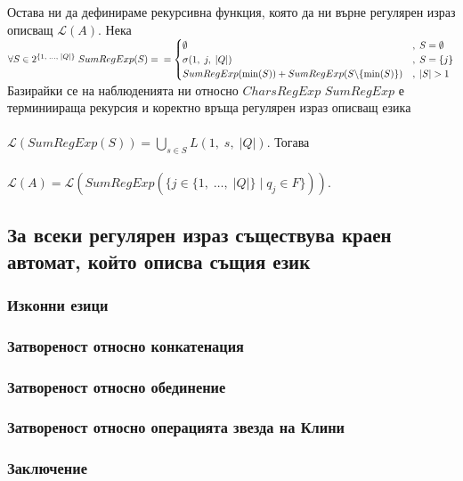 \documentclass[a4paper, 12pt, oneside]{article}
\newcommand{\Lang}{\mathcal{L}}
\begin{document}
Остава ни да дефинираме рекурсивна функция, която да ни върне регулярен израз описващ $\Lang(A)$. Нека \\

$\forall S \in 2^{\{1, \; \dots, \; |Q|\}} \; SumRegExp(S) = \\
= \begin{cases}
    \emptyset & , \; S = \emptyset \\
    \sigma(1, \; j, \; |Q|) & , \; S = \{j\} \\
    SumRegExp(\min(S)) + SumRegExp(S \backslash \{\min(S)\}) & , \; |S| > 1 
\end{cases}$ \\

Базирайки се на наблюденията ни относно $CharsRegExp$ $SumRegExp$
е терминиираща рекурсия и коректно връща регулярен израз описващ езика \\\\
$\Lang(SumRegExp(S)) = \displaystyle\bigcup_{s \in S} L(1, \; s, \; |Q|)$. Тогава \\\\

$\Lang(A) = \Lang(SumRegExp(\{j \in \{1, \; \dots, \; |Q|\} \; | \; q_j \in F\}))$.

\subsection{За всеки регулярен израз съществува краен автомат, който описва същия език}

\subsubsection{Изконни езици}

\subsubsection{Затвореност относно конкатенация}

\subsubsection{Затвореност относно обединение}

\subsubsection{Затвореност относно операцията звезда на Клини}

\subsubsection{Заключение}
\end{document}
